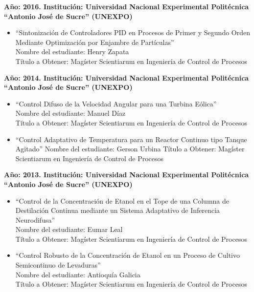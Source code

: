 \begin{footnotesize}
  \begin{flushleft}

\textbf{Año: 2016. Institución: Universidad Nacional Experimental Politécnica “Antonio José de Sucre” (UNEXPO)}\\
\begin{itemize}
\item “Sintonización de Controladores PID en Procesos de Primer y Segundo Orden Mediante Optimización por Enjambre de Partículas”\\
Nombre del estudiante: Henry Zapata\\ 
Título a Obtener: Magíster Scientiarum en Ingeniería de Control de Procesos    
\end{itemize}
  
\textbf{Año: 2014. Institución: Universidad Nacional Experimental Politécnica “Antonio José de Sucre” (UNEXPO)}\\
\begin{itemize}
\item “Control Difuso de la Velocidad Angular para una Turbina Eólica”\\
Nombre del estudiante: Manuel Díaz\\ 
Título a Obtener: Magíster Scientiarum en Ingeniería de Control de Procesos \\
\item “Control Adaptativo de Temperatura para un Reactor Continuo tipo Tanque Agitado”
Nombre del estudiante: Gerson Urbina 
Título a Obtener: Magíster Scientiarum en Ingeniería de Control de Procesos 
\end{itemize}

\textbf{Año: 2013. Institución: Universidad Nacional Experimental Politécnica “Antonio José de Sucre” (UNEXPO)}\\
\begin{itemize}
\item “Control de la Concentración de Etanol en el Tope de una Columna de Destilación Continua mediante un Sistema Adaptativo de Inferencia Neurodifusa”\\
Nombre del estudiante: Eumar Leal\\
Título a Obtener: Magíster Scientiarum en Ingeniería de Control de Procesos
\item “Control Robusto de la Concentración de Etanol en un Proceso de Cultivo Semicontinuo de Levaduras”\\
Nombre del estudiante: Antioquía Galicia\\
Título a Obtener: Magíster Scientiarum en Ingeniería de Control de Procesos 
\end{itemize}


\end{flushleft}
\end{footnotesize}
